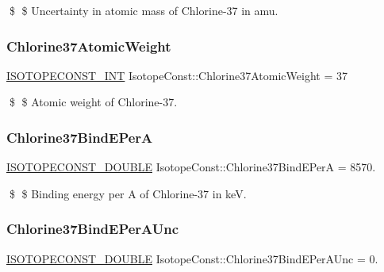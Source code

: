 \$ \$ Uncertainty in atomic mass of Chlorine-\/37 in amu. \mbox{\label{group___isotope_const-_chlorine-_cl37_gac2fd280d38c97d78eeded8cdf9545e01}} 
\subsubsection{\texorpdfstring{Chlorine37\+Atomic\+Weight}{Chlorine37AtomicWeight}}
{\footnotesize\ttfamily \mbox{\hyperlink{group___isotope_const-_macros_ga5f18360b3e99483a35c32d789e62621c}{I\+S\+O\+T\+O\+P\+E\+C\+O\+N\+S\+T\+\_\+\+I\+NT}} Isotope\+Const\+::\+Chlorine37\+Atomic\+Weight = 37}

\$ \$ Atomic weight of Chlorine-\/37. \mbox{\label{group___isotope_const-_chlorine-_cl37_ga3c8221b4833e187e447bc20184ef0319}} 
\subsubsection{\texorpdfstring{Chlorine37\+Bind\+E\+PerA}{Chlorine37BindEPerA}}
{\footnotesize\ttfamily \mbox{\hyperlink{group___isotope_const-_macros_ga8f45a7272ce02c0b4c65c44636ed719a}{I\+S\+O\+T\+O\+P\+E\+C\+O\+N\+S\+T\+\_\+\+D\+O\+U\+B\+LE}} Isotope\+Const\+::\+Chlorine37\+Bind\+E\+PerA = 8570.}

\$ \$ Binding energy per A of Chlorine-\/37 in keV. \mbox{\label{group___isotope_const-_chlorine-_cl37_gac208e3da6f6400e70a7916484ed41ee2}} 
\subsubsection{\texorpdfstring{Chlorine37\+Bind\+E\+Per\+A\+Unc}{Chlorine37BindEPerAUnc}}
{\footnotesize\ttfamily \mbox{\hyperlink{group___isotope_const-_macros_ga8f45a7272ce02c0b4c65c44636ed719a}{I\+S\+O\+T\+O\+P\+E\+C\+O\+N\+S\+T\+\_\+\+D\+O\+U\+B\+LE}} Isotope\+Const\+::\+Chlorine37\+Bind\+E\+Per\+A\+Unc = 0.}

